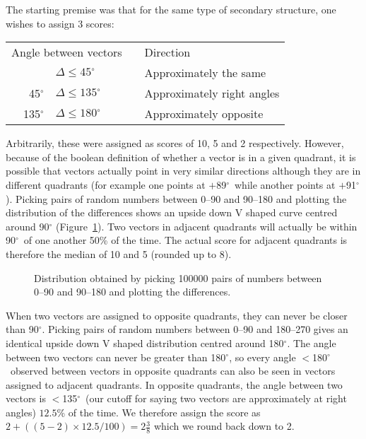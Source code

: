 \documentclass{article}
\newcommand{\degrees}{\mbox{${}^{\circ}$}}
\begin{document}
The starting premise was that for the same type of secondary
structure, one wishes to assign 3 scores: 
\begin{center}
\begin{tabular}{rlll}
\multicolumn{2}{l}{Angle between vectors}&\hspace{1cm}& Direction  \\
            & $\Delta\le 45\degrees$     && Approximately the same \\
45\degrees  & $\Delta\le 135\degrees$    && Approximately right angles \\
135\degrees & $\Delta\le 180\degrees$    && Approximately opposite \\
\end{tabular}
\end{center}
\noindent Arbitrarily, these were assigned as scores of 10, 5 and 2
respectively. However, because of the boolean definition of whether a
vector is in a given quadrant, it is possible that vectors actually
point in very similar directions although they are in different
quadrants (for example one points at $+$89\degrees\ while another
points at $+$91\degrees). Picking pairs of random numbers between
0--90 and 90--180 and plotting the distribution of the differences
shows an upside down V shaped curve centred around 90\degrees
(Figure~\ref{fig:dist}). Two vectors in adjacent quadrants will
actually be within 90\degrees\ of one another 50\% of the time. The
actual score for adjacent quadrants is therefore the median of 10 and
5 (rounded up to 8).

\begin{figure}
\centerline{}
\caption{\label{fig:dist}Distribution obtained by picking 100000 pairs
of numbers between 0--90 and 90--180 and plotting the differences.}
\end{figure}

When two vectors are assigned to opposite quadrants, they can never be
closer than 90\degrees. Picking pairs of random numbers between 0--90
and 180--270 gives an identical upside down V shaped distribution
centred around 180\degrees. The angle between two vectors can never be
greater than 180\degrees, so every angle $<$180\degrees\ observed
between vectors in opposite quadrants can also be seen in vectors
assigned to adjacent quadrants.  In opposite quadrants, the angle
between two vectors is $<$135\degrees\ (our cutoff for saying two
vectors are approximately at right angles) $12.5$\% of the time. We
therefore assign the score as $2+((5-2)\times 12.5/100) =
2\frac{3}{8}$ which we round back down to 2.
\end{document}
